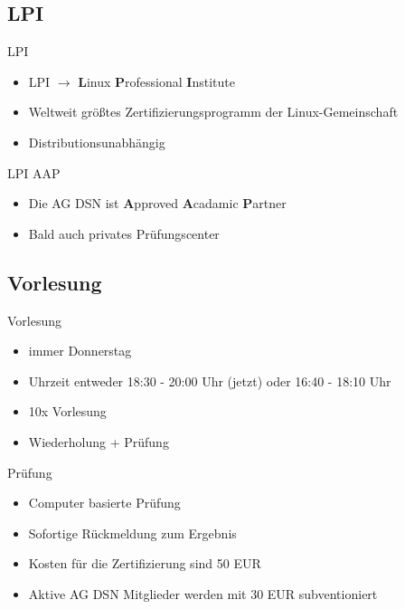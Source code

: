 \documentclass[aspectratio=43]{beamer}
\begin{document}
\subsection{LPI}
\begin{frame} 

	\begin{block}{LPI} 
	\begin{itemize}
	\item LPI $\rightarrow$ \textbf{L}inux \textbf{P}rofessional \textbf{I}nstitute
	\item Weltweit größtes Zertifizierungsprogramm der Linux-Gemeinschaft
	\item Distributionsunabhängig
	\end{itemize}
	\end{block}
	
	\begin{block}{LPI AAP} 
	\begin{itemize}
	\item Die AG DSN ist \textbf{A}pproved \textbf{A}cadamic \textbf{P}artner
	\item Bald auch privates Prüfungscenter
	\end{itemize}
	\end{block}
\end{frame}

\subsection{Vorlesung}
\begin{frame} 
	\begin{block}{Vorlesung} 
	\begin{itemize}
	\item immer Donnerstag
	\item Uhrzeit entweder 18:30 - 20:00 Uhr (jetzt)
	\newline oder 16:40 - 18:10 Uhr
	\item 10x Vorlesung
	\item Wiederholung + Prüfung
	\end{itemize}
	\end{block}
	
	\begin{block}{Prüfung} 
	\begin{itemize}
	\item Computer basierte Prüfung 
	\item Sofortige Rückmeldung zum Ergebnis 
	\item Kosten für die Zertifizierung sind 50 EUR
	\item Aktive AG DSN Mitglieder werden mit 30 EUR subventioniert
	\end{itemize}
	\end{block}
\end{frame}
\end{document}
